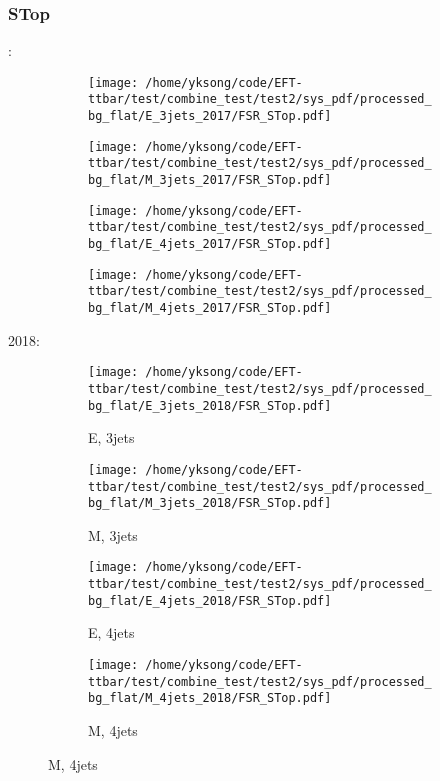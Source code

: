 \documentclass{beamer}
\begin{document}
\begin{frame}
\frametitle{STop}
\fontsize{5}{1}:
\begin{figure}
\centering
\begin{subfigure}[b]{0.24\textwidth}
\texttt{[image: /home/yksong/code/EFT-ttbar/test/combine\_test/test2/sys\_pdf/processed\_bg\_flat/E\_3jets\_2017/FSR\_STop.pdf]}
\end{subfigure}
\begin{subfigure}[b]{0.24\textwidth}
\texttt{[image: /home/yksong/code/EFT-ttbar/test/combine\_test/test2/sys\_pdf/processed\_bg\_flat/M\_3jets\_2017/FSR\_STop.pdf]}
\end{subfigure}
\begin{subfigure}[b]{0.24\textwidth}
\texttt{[image: /home/yksong/code/EFT-ttbar/test/combine\_test/test2/sys\_pdf/processed\_bg\_flat/E\_4jets\_2017/FSR\_STop.pdf]}
\end{subfigure}
\begin{subfigure}[b]{0.24\textwidth}
\texttt{[image: /home/yksong/code/EFT-ttbar/test/combine\_test/test2/sys\_pdf/processed\_bg\_flat/M\_4jets\_2017/FSR\_STop.pdf]}
\end{subfigure}
\end{figure}
2018:
\begin{figure}
\centering
\begin{subfigure}[b]{0.24\textwidth}
\texttt{[image: /home/yksong/code/EFT-ttbar/test/combine\_test/test2/sys\_pdf/processed\_bg\_flat/E\_3jets\_2018/FSR\_STop.pdf]}
\captionsetup{font=tiny}
\caption{E, 3jets}
\end{subfigure}
\begin{subfigure}[b]{0.24\textwidth}
\texttt{[image: /home/yksong/code/EFT-ttbar/test/combine\_test/test2/sys\_pdf/processed\_bg\_flat/M\_3jets\_2018/FSR\_STop.pdf]}
\captionsetup{font=tiny}
\caption{M, 3jets}
\end{subfigure}
\begin{subfigure}[b]{0.24\textwidth}
\texttt{[image: /home/yksong/code/EFT-ttbar/test/combine\_test/test2/sys\_pdf/processed\_bg\_flat/E\_4jets\_2018/FSR\_STop.pdf]}
\captionsetup{font=tiny}
\caption{E, 4jets}
\end{subfigure}
\begin{subfigure}[b]{0.24\textwidth}
\texttt{[image: /home/yksong/code/EFT-ttbar/test/combine\_test/test2/sys\_pdf/processed\_bg\_flat/M\_4jets\_2018/FSR\_STop.pdf]}
\captionsetup{font=tiny}
\caption{M, 4jets}
\end{subfigure}
\end{figure}
\end{frame}
\end{document}
